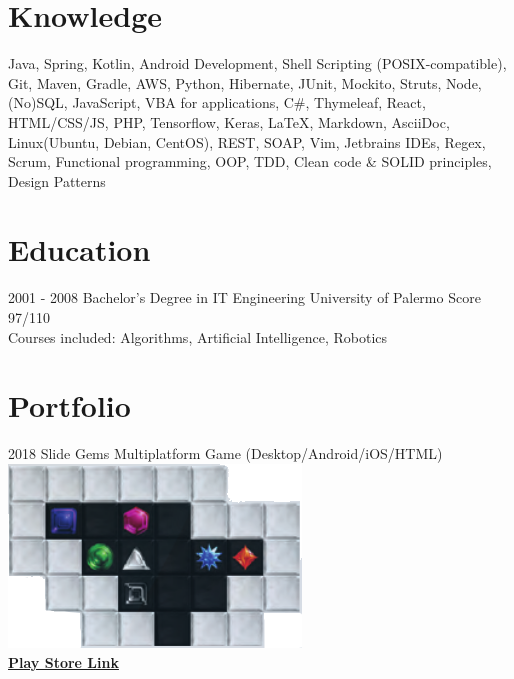 \documentclass[]{friggeri-cv}
\begin{document}
\newpage

\section{Knowledge}
{Java, Spring, Kotlin, Android Development, Shell Scripting {\tiny(POSIX-compatible)}, Git, Maven, Gradle, AWS, Python, Hibernate, JUnit, Mockito, Struts, Node, {\tiny(No)}SQL, JavaScript, VBA for applications, C\#, Thymeleaf, React, HTML/CSS/JS, PHP, Tensorflow, Keras, \LaTeX, Markdown, AsciiDoc, Linux{\tiny(Ubuntu, Debian, CentOS)}, REST, SOAP, Vim, Jetbrains IDEs, Regex, Scrum, Functional programming, OOP, TDD, Clean code \& SOLID principles, Design Patterns}

\section{Education}
\begin{entrylist}
  \entry
    {2001 - 2008}
    {Bachelor's Degree in IT Engineering}
    {University of Palermo}
    {Score 97/110\\
    Courses included: Algorithms, Artificial Intelligence, Robotics}
\end{entrylist}

\section{Portfolio}
\begin{entrylist}
  \entry
    {2018}
    {Slide Gems}
    {Multiplatform Game (Desktop/Android/iOS/HTML)}
    {{\includegraphics[scale=0.50]{img/slide_gems_snip.png}}\\\href{https://bit.ly/2Gwwct5}{\textbf{Play Store Link}}}
    
    
     
\end{entrylist}
\end{document}
